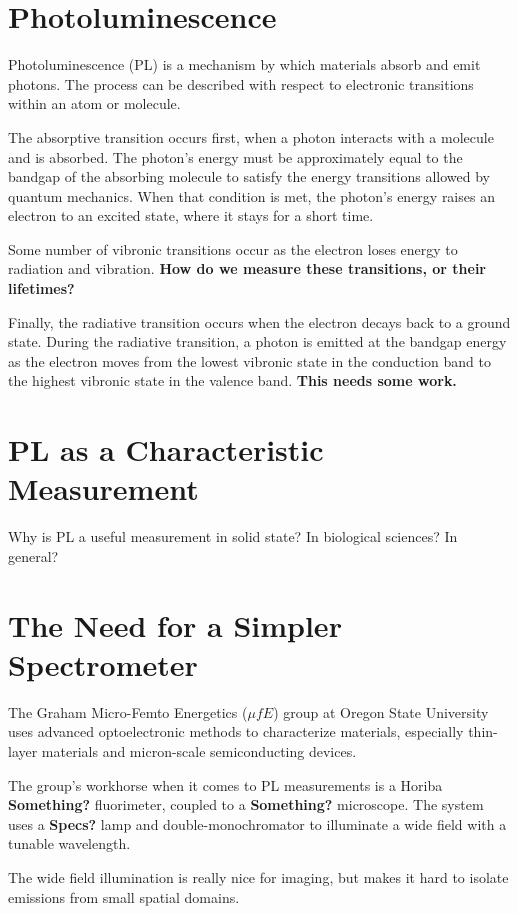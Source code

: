 \section{Photoluminescence}
Photoluminescence (PL) is a mechanism by which materials absorb and emit photons. The process can be described with respect to electronic transitions within an atom or molecule.

The absorptive transition occurs first, when a photon interacts with a molecule and is absorbed. The photon's energy must be approximately equal to the bandgap of the absorbing molecule to satisfy the energy transitions allowed by quantum mechanics. When that condition is met, the photon's energy raises an electron to an excited state, where it stays for a short time.

Some number of vibronic transitions occur as the electron loses energy to radiation and vibration. \textbf{How do we measure these transitions, or their lifetimes?}

Finally, the radiative transition occurs when the electron decays back to a ground state. During the radiative transition, a photon is emitted at the bandgap energy as the electron moves from the lowest vibronic state in the conduction band to the highest vibronic state in the valence band. \textbf{This needs some work.}

\section{PL as a Characteristic Measurement}
Why is PL a useful measurement in solid state? In biological sciences? In general?


\section{The Need for a Simpler Spectrometer}
The Graham Micro-Femto Energetics ($\mu fE$) group at Oregon State University uses advanced optoelectronic methods to characterize materials, especially thin-layer materials and micron-scale semiconducting devices.

The group's workhorse when it comes to PL measurements is a Horiba \textbf{Something?} fluorimeter, coupled to a \textbf{Something?} microscope. The system uses a \textbf{Specs?} lamp and double-monochromator to illuminate a wide field with a tunable wavelength.

The wide field illumination is really nice for imaging, but makes it hard to isolate emissions from small spatial domains.

